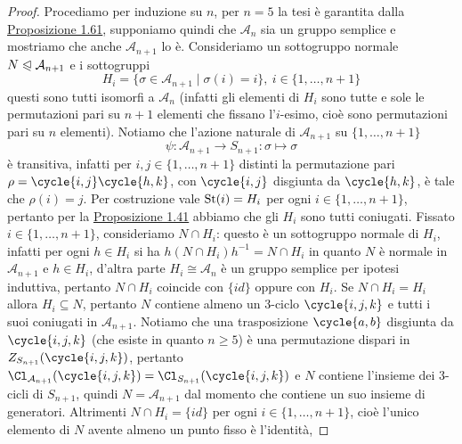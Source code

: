 \documentclass[11pt]{scrartcl}
\begin{document}
\begin{proof}
    Procediamo per induzione su $n$, per $n = 5$ la tesi è garantita dalla 
    \hyperref[prop3.0]{Proposizione 1.61}, supponiamo quindi che $\mathcal{A}_n$
    sia un gruppo semplice e mostriamo che anche $\mathcal{A}_{n + 1}$ lo è.
    Consideriamo un sottogruppo normale $N \trianglelefteqslant \mathcal{A}_{n + 1}$
    e i sottogruppi 
    \[
        H_i = \{\sigma \in \mathcal{A}_{n + 1}\mid \sigma(i) = i\},~
        i \in \{1, \ldots, n + 1\}
    \]
    questi sono tutti isomorfi a $\mathcal{A}_n$ (infatti
    gli elementi di $H_i$ sono tutte e sole le permutazioni pari su $n + 1$
    elementi che fissano l'$i$-esimo, cioè sono permutazioni pari su $n$ elementi).
    Notiamo che l'azione naturale di $\mathcal{A}_{n + 1}$ su $\{1, \ldots, n + 1\}$
    \[
        \psi:\mathcal{A}_{n + 1} \longrightarrow S_{n + 1} :\sigma \longmapsto \sigma
    \]
    è transitiva, infatti per $i, j \in \{1, \ldots, n + 1\}$ distinti 
    la permutazione pari $\rho =\nolinebreak \cycle{i, j}\cycle{h, k}$, con $\cycle{i, j}$
    disgiunta da $\cycle{h, k}$, è tale che $\rho(i) = j$. Per costruzione 
    vale $\operatorname{St}(i) = H_i$ per ogni $i \in \{1, \ldots, n + 1\}$, pertanto
    per la \hyperref[prop1.0]{Proposizione 1.41} abbiamo che gli $H_i$ sono 
    tutti coniugati.\newline
    Fissato $i \in \{1, \ldots, n + 1\}$, consideriamo $N \cap H_i$: questo
    è un sottogruppo normale di $H_i$, infatti per ogni $h \in H_i$ si ha 
    $h(N\cap H_i)h^{-1} = N\cap H_i$ in quanto $N$ è normale in $\mathcal{A}_{n + 1}$
    e $h \in H_i$, d'altra parte $H_i \cong \mathcal{A}_n$ è un gruppo semplice
    per ipotesi induttiva, pertanto $N\cap H_i$ coincide con $\{id\}$ oppure 
    con $H_i$. \newline
    Se $N \cap H_i = H_i$ allora $H_i \subseteq N$, pertanto $N$ 
    contiene almeno un 3-ciclo $\cycle{i, j, k}$ e tutti i suoi coniugati in 
    $\mathcal{A}_{n + 1}$. Notiamo che una trasposizione $\cycle{a, b}$
    disgiunta da $\cycle{i, j, k}$ (che esiste in quanto $n \geq 5$) è una
    permutazione dispari in $Z_{S_{n + 1}}(\cycle{i, j, k})$, pertanto 
    $\Cl_{\mathcal{A}_{n + 1}}(\cycle{i, j, k}) = \Cl_{S_{n + 1}}(\cycle{i, j, k})$
    e $N$ contiene l'insieme dei 3-cicli di $S_{n + 1}$, quindi $N = 
    \mathcal{A}_{n + 1}$ dal momento che contiene un suo insieme di generatori.
    \newline
    Altrimenti $N\cap H_i = \{id\}$ per ogni $i \in \{1, \ldots, n + 1\}$,
    cioè l'unico elemento di $N$ avente almeno un punto fisso è l'identità,

\end{proof}
\end{document}
